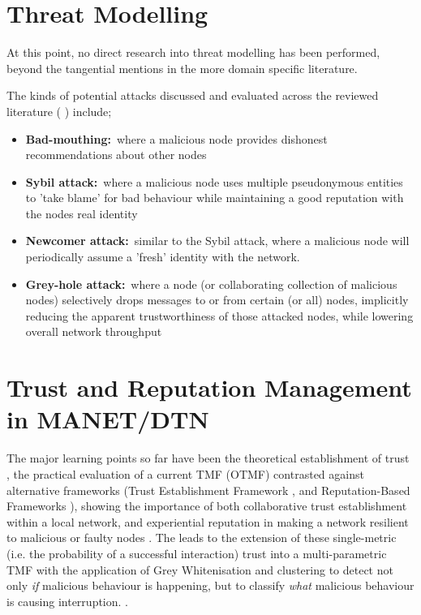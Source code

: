 \documentclass[twoside,10pt,a4paper]{Latex/Classes/PhDthesisPSnPDF}
\begin{document}
\section{Threat Modelling}
At this point, no direct research into threat modelling has been performed, 
beyond the tangential mentions in the more domain specific literature. 

The kinds of potential attacks discussed and evaluated across the reviewed
literature ( \cite{Liu2006} \cite{Guo}) include;
\begin{itemize}
  \item \textbf{Bad-mouthing:}~where a malicious node provides dishonest
    recommendations about other nodes
  \item \textbf{Sybil attack:}~where a malicious node uses multiple 
    pseudonymous
    entities to 'take blame' for bad behaviour while maintaining a good
    reputation with the nodes real identity
  \item \textbf{Newcomer attack:}~similar to the Sybil attack, where a 
    malicious
    node will periodically assume a 'fresh' identity with the network.
  \item \textbf{Grey-hole attack:}~where a node (or collaborating collection of
    malicious nodes) selectively drops messages to or from certain (or all)
    nodes, implicitly reducing the apparent trustworthiness of those attacked
    nodes, while lowering overall network throughput
\end{itemize}

\section{Trust and Reputation Management in MANET/DTN}

The major learning points so far have been the theoretical establishment of
trust \cite{Liu2006}, the practical evaluation of a current TMF (OTMF) 
contrasted against alternative frameworks (Trust Establishment Framework 
\cite{Buchegger2002}, and Reputation-Based Frameworks \cite{Marti2000}), 
showing the importance of both collaborative trust establishment within a local 
network, and experiential reputation in making a network resilient to malicious 
or faulty nodes \cite{Li2007a}. The leads to the extension of these 
single-metric (i.e.  the probability of a successful interaction) trust into a 
multi-parametric TMF with the application of Grey Whitenisation and clustering 
to detect not only \emph{if} malicious behaviour is happening, but to classify 
\emph{what} malicious behaviour is causing interruption. \cite{Guo}.
\end{document}
